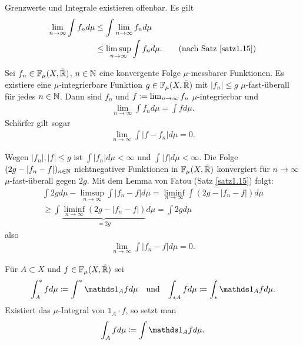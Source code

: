\documentclass[a4paper,twoside,DIV15,BCOR12mm]{scrbook}
\newcommand{\ind}{\mathds 1}
\begin{document}
\begin{beweis}
Grenzwerte und Integrale existieren offenbar. Es gilt 
\begin{align*}
\lim_{n\to\infty}\int f_n d\mu 
&\le \int \lim_{n\to\infty} f_n d\mu \\
&\le \limsup_{n\to\infty} \int f_n d\mu. \tag{nach Satz \ref{satz1.15}}
\end{align*}
\end{beweis}

\begin{satz}[Lebesgue]
\label{satz1.17}
Sei $f_n\in\mathbb F_\mu(X,\bar{\mathbb{R}})$, $n\in\mathbb{N}$ eine konvergente Folge $\mu$-messbarer Funktionen. Es existiere eine $\mu$-integrierbare Funktion $g\in\mathbb F_\mu(X,\bar{\mathbb{R}})$ mit $|f_n|\le g$ $\mu$-fast-überall für jedes $n\in\mathbb{N}$. Dann sind $f_n$ und $f\da \lim_{n\to\infty} f_n$ $\mu$-integrierbar und 
\begin{align*}
\lim_{n\to\infty} \int f_n d\mu = \int f d\mu.
\end{align*}
Schärfer gilt sogar
\begin{align*}
\lim_{n\to\infty} \int |f-f_n| d\mu = 0.
\end{align*}
\end{satz}

\begin{beweis}
Wegen $|f_n|,|f| \le g$ ist $\int |f_n| d\mu <\infty$ und $\int |f|d\mu <\infty$. Die Folge $(2g-|f_n-f|)_{n\in\mathbb{N}}$ nichtnegativer Funktionen in $\mathbb F_\mu(X,\bar{\mathbb{R}})$ konvergiert für $n\to\infty$ $\mu$-fast-überall gegen $2g$. Mit dem Lemma von Fatou (Satz \ref{satz1.15}) folgt:
\begin{multline*}
\int 2g d\mu - \limsup_{n\to\infty} \int |f_n -f|d\mu
= \liminf_{n\to\infty} \int (2g - |f_n -f|) d\mu \\
\ge \int \underbrace{\liminf_{n\to\infty}(2g - |f_n -f|)}_{=2g} d\mu = \int 2gd\mu
\end{multline*}
also 
\begin{align*}
\lim_{n\to\infty} \int |f_n -f| d\mu = 0.
\end{align*}
\end{beweis}

\begin{notation}
Für $A\subset X$ und $f\in\mathbb F_\mu (X,\bar{\mathbb{R}})$ sei
\begin{align*}
\int^*_A fd\mu \da \int^* \ind_{A}f d\mu && \text{und} &&
\int_{*A} fd\mu \da \int_* \ind_{A}f d\mu.
\end{align*}
Existiert das $\mu$-Integral von $\ind_A \cdot f$, so setzt man
\begin{align*}
\int_A f d\mu \da \int \ind_A fd\mu.
\end{align*}
\end{notation}
\end{document}
